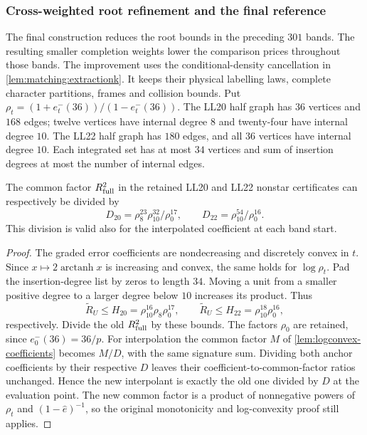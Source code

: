 \subsubsection{Cross-weighted root refinement and the final reference}
\label{subsec:upper-cross-weighted}

The final construction reduces the root bounds in the preceding $301$
bands. The resulting smaller completion weights lower the comparison
prices throughout those bands. The improvement uses
the conditional-density cancellation in
\cref{lem:matching:extractionk}. It keeps their physical labelling
laws, complete character partitions, frames and collision bounds.
Put $\rho_t=(1+e_t^-(36))/(1-e_t^-(36))$.
The LL20 half graph has $36$ vertices and $168$ edges; twelve
vertices have internal degree $8$ and twenty-four have internal
degree $10$. The LL22 half graph has $180$ edges, and all $36$
vertices have internal degree $10$.
Each integrated set has at most $34$ vertices and sum of insertion
degrees at most the number of internal edges.

\begin{lemma}\label{lem:upper-cross-divisors}
The common factor $R_{\rm full}^2$ in the retained LL20 and LL22
nonstar certificates can respectively be divided by
\[
 D_{20}=\rho_8^{23}\rho_{10}^{32}/\rho_0^{17},
 \qquad D_{22}=\rho_{10}^{54}/\rho_0^{16}.
\]
This division is valid also for the interpolated coefficient at each
band start.
\end{lemma}

\begin{proof}
The graded error coefficients are nondecreasing and discretely convex
in $t$. Since $x\mapsto2\operatorname{arctanh}x$ is increasing and
convex, the same holds for $\log\rho_t$. Pad the insertion-degree list
by zeros to length $34$. Moving a unit from a smaller positive degree
to a larger degree below $10$ increases its product. Thus
\[
 \widetilde R_U\le H_{20}=\rho_{10}^{16}\rho_8\rho_0^{17},
 \qquad
 \widetilde R_U\le H_{22}=\rho_{10}^{18}\rho_0^{16},
\]
respectively. Divide the old $R_{\rm full}^2$ by these bounds.
The factors $\rho_0$ are retained, since $e_0^-(36)=36/p$.
For interpolation the common factor $M$ of
\cref{lem:logconvex-coefficients} becomes $M/D$, with the same
signature sum. Dividing both anchor coefficients by their respective
$D$ leaves their coefficient-to-common-factor ratios unchanged.
Hence the new interpolant is exactly the old one divided by $D$
at the evaluation point. The new common factor is a product of
nonnegative powers of $\rho_t$ and $(1-\hat e)^{-1}$, so the original
monotonicity and log-convexity proof still applies.
\end{proof}

